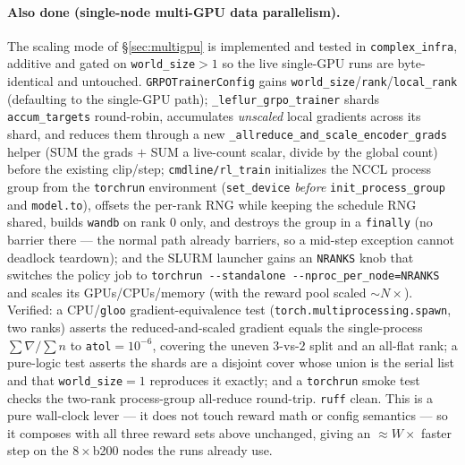 \documentclass[11pt]{article}
\newcommand{\ttk}[1]{\texttt{\small #1}}
\begin{document}
\paragraph{Also done (single-node multi-GPU data parallelism).}
The scaling mode of \S\ref{sec:multigpu} is implemented and tested in \ttk{complex\_infra}, additive
and gated on \ttk{world\_size}$>1$ so the live single-GPU runs are byte-identical and untouched.
\ttk{GRPOTrainerConfig} gains \ttk{world\_size}/\ttk{rank}/\ttk{local\_rank} (defaulting to the
single-GPU path); \ttk{\_leflur\_grpo\_trainer} shards \ttk{accum\_targets} round-robin, accumulates
\emph{unscaled} local gradients across its shard, and reduces them through a new
\ttk{\_allreduce\_and\_scale\_encoder\_grads} helper (SUM the grads $+$ SUM a live-count scalar,
divide by the global count) before the existing clip/step; \ttk{cmdline/rl\_train} initializes the
NCCL process group from the \ttk{torchrun} environment (\ttk{set\_device} \emph{before}
\ttk{init\_process\_group} and \ttk{model.to}), offsets the per-rank RNG while keeping the schedule
RNG shared, builds \ttk{wandb} on rank $0$ only, and destroys the group in a \ttk{finally} (no barrier
there --- the normal path already barriers, so a mid-step exception cannot deadlock teardown); and the
SLURM launcher gains an \ttk{NRANKS} knob that switches the policy job to
\ttk{torchrun -\/-standalone -\/-nproc\_per\_node=NRANKS} and scales its GPUs/CPUs/memory (with the
reward pool scaled $\sim\!N\times$). Verified: a CPU/\ttk{gloo} gradient-equivalence test
(\ttk{torch.multiprocessing.spawn}, two ranks) asserts the reduced-and-scaled gradient equals the
single-process $\sum\nabla/\sum n$ to \ttk{atol}$=10^{-6}$, covering the uneven $3$-vs-$2$ split and an
all-flat rank; a pure-logic test asserts the shards are a disjoint cover whose union is the serial
list and that \ttk{world\_size}$=1$ reproduces it exactly; and a \ttk{torchrun} smoke test checks the
two-rank process-group all-reduce round-trip. \ttk{ruff} clean. This is a pure wall-clock lever --- it
does not touch reward math or config semantics --- so it composes with all three reward sets above
unchanged, giving an $\approx\!W\times$ faster step on the $8\times$b200 nodes the runs already use.
\end{document}
